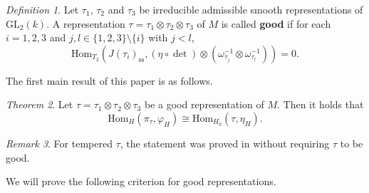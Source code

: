 \documentclass[12pt]{amsart}
\newcommand{\GL}{{\mathrm{GL}}}
\newcommand{\Hom}{{\mathrm{Hom}}}
\theoremstyle{Theorem}
\theoremstyle{Theorem}
\theoremstyle{Theorem}
\theoremstyle{Theorem}
\theoremstyle{Plain}
\theoremstyle{remark}
\theoremstyle{remark}
\theoremstyle{Definition}
\newtheorem{dfn}{Definition}[section]
\newtheorem{thmd}[dfn]{Theorem}
\newtheorem{remarkd}[dfn]{Remark}
\begin{document}
\begin{dfn}
    Let $\tau_1$, $\tau_2$ and $\tau_3$ be irreducible admissible smooth representations of $\GL_2(k)$. A representation $ \tau = \tau_1 \otimes \tau_2 \otimes \tau_3 $ of $M$ is called \textbf{good} if for each $ i = 1, 2, 3 $ and $ j, l \in \{ 1, 2, 3 \} \setminus \{ i \} $ with $ j < l $, 
    \[
        \Hom_{T_2} \left( J( \tau_i )_\mathrm{ss}, ( \eta \circ \det ) \otimes \left( \omega_{ \tau_j }^{-1} \otimes \omega_{ \tau_l }^{-1} \right) \right) = 0.
    \]   
\end{dfn}

The first main result of this paper is as follows.

\begin{thmd}
    \label{mainthm1}
    Let $ \tau = \tau_1 \otimes \tau_2 \otimes \tau_3 $ be a good representation of $M$. Then it holds that
        \[
            \Hom_H \left( \pi_\tau, \varphi_H \right) \cong \Hom_{H_0} \left( \tau, \eta_H \right).
        \]
\end{thmd}
    
\begin{remarkd}
    For tempered $\tau$, the statement was proved in \cite{W} without requiring $\tau$ to be good.
\end{remarkd}

We will prove the following criterion for good representations.
\end{document}
